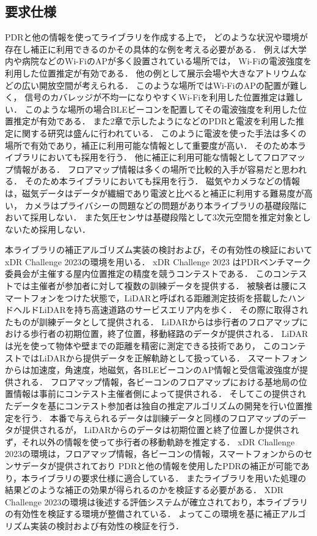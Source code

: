 

\subsection{要求仕様}                                      
PDRと他の情報を使ってライブラリを作成する上で，
どのような状況や環境が存在し補正に利用できるのかその具体的な例を考える必要がある．
例えば大学内や病院などのWi-FiのAPが多く設置されている場所では，
Wi-Fiの電波強度を利用した位置推定が有効である．
他の例として展示会場や大きなアトリウムなどの広い開放空間が考えられる．
このような場所ではWi-FiのAPの配置が難しく，
信号のカバレッジが不均一になりやすくWi-Fiを利用した位置推定は難しい．
このような場所の場合BLEビーコンを配置してその電波強度を利用した位置推定が有効である．
また2章で示したように\cite{pdr-wifi}\cite{pdr-ble}などのPDRと電波を利用した推定に関する研究は盛んに行われている．
このように電波を使った手法は多くの場所で有効であり，補正に利用可能な情報として重要度が高い．
そのため本ライブラリにおいても採用を行う．
他に補正に利用可能な情報としてフロアマップ情報がある．
フロアマップ情報は多くの場所で比較的入手が容易だと思われる．
そのため本ライブラリにおいても採用を行う．
磁気やカメラなどの情報は，磁気データはデータが繊細であり電波と比べると補正に利用する難易度が高い，
カメラはプライバシーの問題などの問題があり本ライブラリの基礎段階において採用しない．
また気圧センサは基礎段階として3次元空間を推定対象としないため採用しない．

本ライブラリの補正アルゴリズム実装の検討および，その有効性の検証においてxDR Challenge 2023\cite{xdr}の環境を用いる．
xDR Challenge 2023 はPDRベンチマーク委員会が主催する屋内位置推定の精度を競うコンテストである．
このコンテストでは主催者が参加者に対して複数の訓練データを提供する．
被験者は腰にスマートフォンをつけた状態で，LiDARと呼ばれる距離測定技術を搭載したハンドヘルドLiDARを持ち高速道路のサービスエリア内を歩く．
その際に取得されたものが訓練データとして提供される．
LiDARからは歩行者のフロアマップにおける歩行者の初期位置，終了位置，移動経路のデータが提供される．
LiDARは光を使って物体や壁までの距離を精密に測定できる技術であり，
このコンテストではLiDARから提供データを正解軌跡として扱っている．
スマートフォンからは加速度，角速度，地磁気，各BLEビーコンのAP情報と受信電波強度が提供される．
フロアマップ情報，各ビーコンのフロアマップにおける基地局の位置情報は事前にコンテスト主催者側によって提供される．
そしてこの提供されたデータを基にコンテスト参加者は独自の推定アルゴリズムの開発を行い位置推定を行う．
本番で与えられるデータは訓練データと同様のフロアマップのデータが提供されるが，
LiDARからのデータは初期位置と終了位置しか提供されず，それ以外の情報を使って歩行者の移動軌跡を推定する．
xDR Challenge 2023の環境は，フロアマップ情報，各ビーコンの情報，スマートフォンからのセンサデータが提供されており
PDRと他の情報を使用したPDRの補正が可能であり，本ライブラリの要求仕様に適合している．
またライブラリを用いた処理の結果どのような補正の効果が得られるのかを検証する必要がある．
XDR Challenge 2023の環境は後述する評価システムが確立されており，本ライブラリの有効性を検証する環境が整備されている．
よってこの環境を基に補正アルゴリズム実装の検討および有効性の検証を行う．
